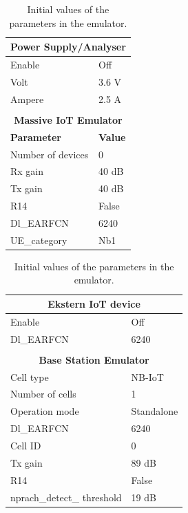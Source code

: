 \begin{table}[H]
\captionsetup{belowskip=0em}
\noindent
\centering
\begin{minipage}[t]{0.48\textwidth}
\begin{tabular}{|p{4cm}|p{2cm}|}
\hline
\multicolumn{2}{|c|}{\textbf{Power Supply/Analyser}}                         \\ \hline
Enable             & Off            \\ \hline
Volt               & 3.6 V          \\ \hline
Ampere             & 2.5 A          \\ \hline
\multicolumn{2}{c}{}\\ \hline
\multicolumn{2}{|c|}{\textbf{Massive IoT Emulator}}                          \\ \hline
\textbf{Parameter} & \textbf{Value} \\ \hline
Number of devices  & 0              \\ \hline
Rx gain            & 40 dB          \\ \hline
Tx gain            & 40 dB          \\ \hline
R14                & False          \\ \hline
Dl\_EARFCN         & 6240           \\ \hline
UE\_category       & Nb1            \\ \hline
\end{tabular}
\end{minipage}%
\hfill
\begin{minipage}[t]{0.48\textwidth}
\begin{tabular}{|p{4cm}|p{2cm}|}
\hline
\multicolumn{2}{|c|}{\textbf{Ekstern IoT device}}                            \\ \hline
Enable             & Off            \\ \hline
Dl\_EARFCN         & 6240           \\ \hline
\multicolumn{2}{c}{}\\ \hline
\multicolumn{2}{|c|}{\textbf{Base Station Emulator}}                         \\ \hline
Cell type          & NB-IoT         \\ \hline
Number of cells    & 1              \\ \hline
Operation mode     & Standalone     \\ \hline
Dl\_EARFCN         & 6240           \\ \hline
Cell ID            & 0              \\ \hline
Tx gain            & 89 dB          \\ \hline
R14                & False          \\ \hline
nprach\_detect\_ threshold  & 19 dB  \\ \hline
\end{tabular}
\end{minipage}
\caption{Initial values of the parameters in the emulator.}
\label{tab:setup_parameters}
\end{table}



